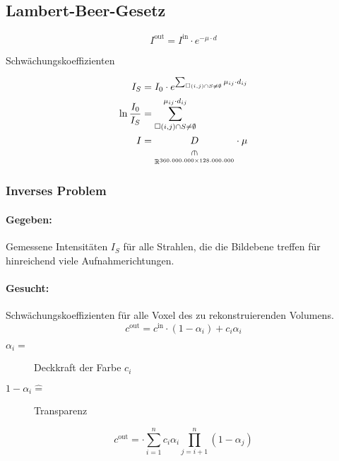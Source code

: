 \subsection{Lambert-Beer-Gesetz}
\[ I^\text{out} = I^\text{in}\cdot e ^{-\mu\cdot d} \]
\begin{center}
	Schwächungskoeffizienten
\end{center}
\begin{align*}
 I_S &= I_0 \cdot e^{ \sum_{\square(i,j) \cap S \neq \emptyset } \mu_{ij}\cdot d_{ij} } \\
 \ln \frac{I_0}{I_S} &= \sum_{\square(i,j)\cap S \neq \emptyset }^{\mu_{ij} \cdot d_{ij} } \\
 I&=\underset{\mathbb{R}^{360. 000. 000 \times 128. 000. 000}}{\underset{\rotatebox{-90}{$\in$}}{D}}\cdot\mu 
\end{align*}
\subsubsection{Inverses Problem}
\paragraph{Gegeben:} Gemessene Intensitäten $I_S$ für alle Strahlen, die die Bildebene treffen für hinreichend viele Aufnahmerichtungen.
\paragraph{Gesucht:} Schwächungskoeffizienten für alle Voxel des zu rekonstruierenden Volumens.
\[ c^\text{out} = c^\text{in}\cdot\left( 1-\alpha_i \right) + c_i\alpha_i \]
\begin{description}
	\item[$\alpha_i =$]  Deckkraft der Farbe $c_i$
	\item[$1-\alpha_i \hat{=} $] Transparenz
\end{description}
\[ c^\text{out} = \cdot \sum_{i=1}^{n}c_i\alpha_i\prod_{j=i+1}^{n}\left(  1-\alpha_j \right) \]